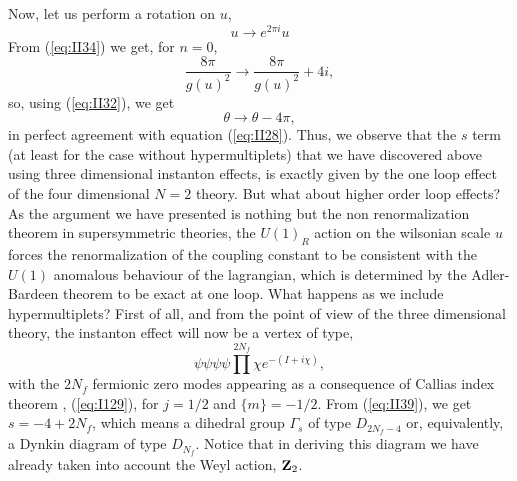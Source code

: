 Now, let us perform a rotation on $u$,
\begin{equation}
u \rightarrow e^{2 \pi i}u
\label{eq:II36}
\end{equation}
From (\ref{eq:II34}) we get, for $n=0$,
\begin{equation}
\frac {8\pi}{g(u)^2} \rightarrow \frac {8\pi}{g(u)^2} + 4i,
\label{eq:II37}
\end{equation}
so, using (\ref{eq:II32}), we get
\begin{equation}
\theta \rightarrow \theta - 4\pi,
\label{eq:II38}
\end{equation}
in perfect agreement with equation (\ref{eq:II28}). Thus, we
observe that the $s$ term (at least for the case without
hypermultiplets) that we have discovered above using three
dimensional instanton effects, is exactly given by the one loop
effect of the four dimensional $N\!=\!2$ theory. But what about
higher order loop effects? As the argument we have presented is
nothing but the non renormalization theorem \cite{Sbeta} in supersymmetric
theories, the $U(1)_R$ action on the wilsonian scale $u$ forces
the renormalization of the coupling constant to be consistent
with the $U(1)$ anomalous behaviour of the lagrangian, which is
determined by the Adler-Bardeen theorem \cite{AB} to be exact at one loop.
What happens as we include hypermultiplets? First of all, and
from the point of view of the three dimensional theory, the
instanton effect will now be a vertex of type,
\begin{equation}
\psi \psi \psi \psi \prod^{2N_f} \chi e^{-(I+i\chi)},
\label{eq:II39}
\end{equation}
with the $2N_f$ fermionic zero modes appearing as a consequence
of Callias index theorem \cite{Callias}, (\ref{eq:I129}), for $j=1/2$ and
$\{m\}=-1/2$. From (\ref{eq:II39}), we get $s=-4+2N_f$, which
means a dihedral group $\Gamma_s$ of type $D_{2N_f-4}$ or,
equivalently, a Dynkin diagram of type $D_{N_f}$. Notice that in
deriving this diagram we have already taken into account the Weyl
action, ${\bf Z}_2$. 
  
